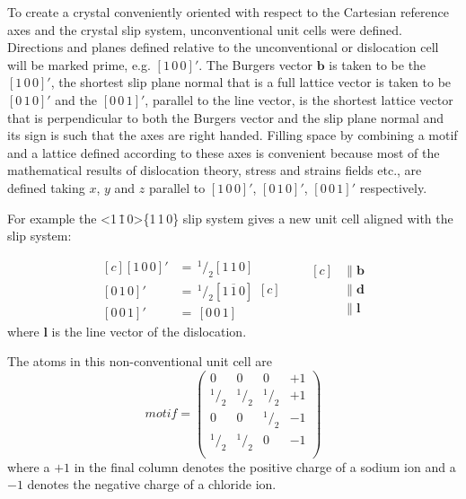 To create a crystal conveniently oriented with respect to the Cartesian reference axes and the crystal slip system, unconventional unit cells were defined. Directions and planes defined relative to the unconventional or dislocation cell will be marked prime, e.g. $[1\,0\,0]'$. The Burgers vector $\mathbf{b}$ is taken to be the $[1\,0\,0]'$, the shortest slip plane normal that is a full lattice vector is taken to be $[0\,1\,0]'$ and the $[0\,0\,1]'$, parallel to the line vector, is the shortest lattice vector that is perpendicular to both the Burgers vector and the slip plane normal and its sign is such that the axes are right handed. Filling space by combining a motif and a lattice defined according to these axes is convenient because most of the mathematical results of dislocation theory, stress and strains fields etc., are defined taking $x$, $y$ and $z$ parallel to $[1\,0\,0]'$, $[0\,1\,0]'$, $[0\,0\,1]'$ respectively.

For example the  <1\,\={1}\,0>\{1\,1\,0\} slip system gives a new unit cell aligned with the slip system:

\begin{equation*}
\begin{aligned}[c]
{[1\,0\,0]}' &=\, ^{1}\!/_{2} [1\,1\,0]   \\
{[0\,1\,0]}' &=\, ^{1}\!/_{2} [1\,\overline{1}\,0]   \\
{[0\,0\,1]}' &=\, [0\,0\,1]   
\end{aligned}[c]
\qquad
\begin{aligned}[c]
&\parallel \mathbf{b} \\
&\parallel \mathbf{d} \\
&\parallel \mathbf{l}
\end{aligned}
\end{equation*}
where $\mathbf{l}$ is the line vector of the dislocation.


The atoms in this non-conventional unit cell are
$$
motif = \begin{pmatrix}
0 & 0 & 0 & +1 \\
^{1}\!/_{2} & ^{1}\!/_{2} & ^{1}\!/_{2} & +1 \\
0 & 0 & ^{1}\!/_{2} & -1 \\
^{1}\!/_{2} & ^{1}\!/_{2} & 0 & -1 \\
\end{pmatrix}
$$
where a $+1$ in the final column denotes the positive charge of a sodium ion and a $-1$ denotes the negative charge of a chloride ion.




